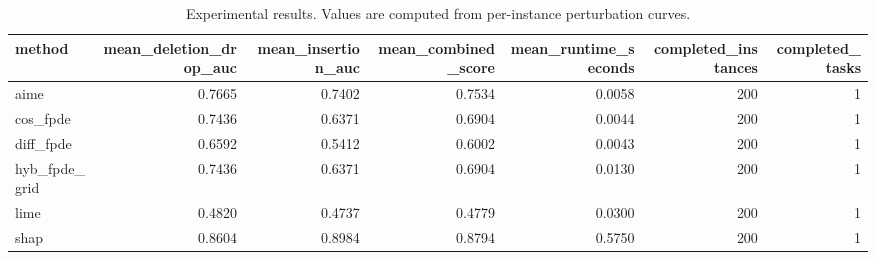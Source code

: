 \begin{table}[t]
\caption{Experimental results. Values are computed from per-instance perturbation curves.}
\label{tab:main_results_computed}
\centering
\begin{tabular}{lrrrrrr}
\toprule
method & mean\_deletion\_drop\_auc & mean\_insertion\_auc & mean\_combined\_score & mean\_runtime\_seconds & completed\_instances & completed\_tasks \\
\midrule
aime & 0.7665 & 0.7402 & 0.7534 & 0.0058 & 200 & 1 \\
cos\_fpde & 0.7436 & 0.6371 & 0.6904 & 0.0044 & 200 & 1 \\
diff\_fpde & 0.6592 & 0.5412 & 0.6002 & 0.0043 & 200 & 1 \\
hyb\_fpde\_grid & 0.7436 & 0.6371 & 0.6904 & 0.0130 & 200 & 1 \\
lime & 0.4820 & 0.4737 & 0.4779 & 0.0300 & 200 & 1 \\
shap & 0.8604 & 0.8984 & 0.8794 & 0.5750 & 200 & 1 \\
\bottomrule
\end{tabular}

\end{table}
